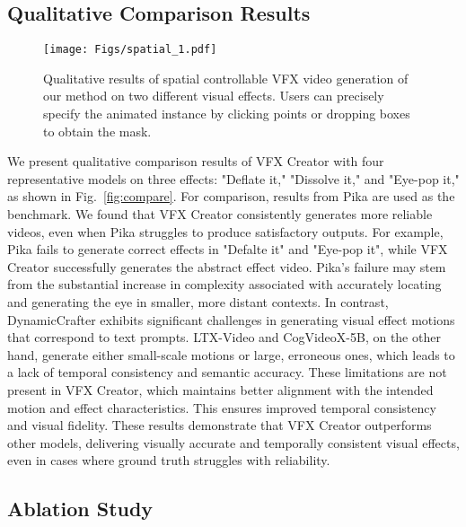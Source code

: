 \subsection{Qualitative Comparison Results}

\begin{figure*}
    \centering
    \texttt{[image: Figs/spatial\_1.pdf]}  %
    \caption{Qualitative results of spatial controllable VFX video generation of our method on two different visual effects. Users can precisely specify the animated instance by clicking points or dropping boxes to obtain the mask.}
    \label{fig:spatial}
\end{figure*}

We present qualitative comparison results of VFX Creator with four representative models on three effects: "Deflate it," "Dissolve it," and "Eye-pop it," as shown in Fig.~\ref{fig:compare}. For comparison, results from Pika are used as the benchmark. We found that VFX Creator consistently generates more reliable videos, even when Pika struggles to produce satisfactory outputs. For example, Pika fails to generate correct effects in "Defalte it" and "Eye-pop it", while VFX Creator successfully generates the abstract effect video. Pika's failure may stem from the substantial increase in complexity associated with accurately locating and generating the eye in smaller, more distant contexts. In contrast, DynamicCrafter exhibits significant challenges in generating visual effect motions that correspond to text prompts. LTX-Video and CogVideoX-5B, on the other hand, generate either small-scale motions or large, erroneous ones, which leads to a lack of temporal consistency and semantic accuracy. These limitations are not present in VFX Creator, which maintains better alignment with the intended motion and effect characteristics. This ensures improved temporal consistency and visual fidelity.
These results demonstrate that VFX Creator outperforms other models, delivering visually accurate and temporally consistent visual effects, even in cases where ground truth struggles with reliability. 
\subsection{Ablation Study}


